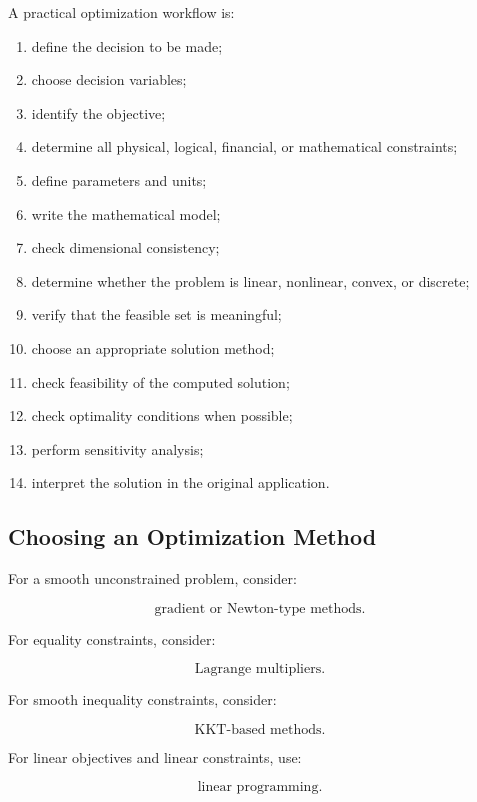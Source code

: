 A practical optimization workflow is:

\begin{enumerate}
    \item define the decision to be made;
    \item choose decision variables;
    \item identify the objective;
    \item determine all physical, logical, financial, or mathematical
          constraints;
    \item define parameters and units;
    \item write the mathematical model;
    \item check dimensional consistency;
    \item determine whether the problem is linear, nonlinear, convex, or
          discrete;
    \item verify that the feasible set is meaningful;
    \item choose an appropriate solution method;
    \item check feasibility of the computed solution;
    \item check optimality conditions when possible;
    \item perform sensitivity analysis;
    \item interpret the solution in the original application.
\end{enumerate}

\subsection{Choosing an Optimization Method}
\label{subsec:choosing-optimization-method}

For a smooth unconstrained problem, consider:

\[
\boxed{
\text{gradient or Newton-type methods}.
}
\]

For equality constraints, consider:

\[
\boxed{
\text{Lagrange multipliers}.
}
\]

For smooth inequality constraints, consider:

\[
\boxed{
\text{KKT-based methods}.
}
\]

For linear objectives and linear constraints, use:

\[
\boxed{
\text{linear programming}.
}
\]

